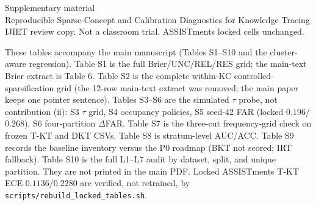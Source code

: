 \documentclass[11pt,a4paper]{article}
\begin{document}
\begin{center}
{\large Supplementary material}\\[4pt]
{\normalsize Reproducible Sparse-Concept and Calibration Diagnostics for Knowledge Tracing}\\[2pt]
{\small IJIET review copy. Not a classroom trial. ASSISTments locked cells unchanged.}
\end{center}
\vspace{0.8em}
\noindent These tables accompany the main manuscript (Tables S1--S10 and the cluster-aware regression). Table S1 is the full Brier/UNC/REL/RES grid; the main-text Brier extract is Table 6. Table S2 is the complete within-KC controlled-sparsification grid (the 12-row main-text extract was removed; the main paper keeps one pointer sentence). Tables S3--S6 are the simulated $\tau$ probe, not contribution (ii): S3 $\tau$ grid, S4 occupancy policies, S5 seed-42 FAR (locked $0.196$/$0.268$), S6 four-partition $\Delta$FAR. Table S7 is the three-cut frequency-grid check on frozen T-KT and DKT CSVs. Table S8 is stratum-level AUC/ACC. Table S9 records the baseline inventory versus the P0 roadmap (BKT not scored; IRT fallback). Table S10 is the full L1--L7 audit by dataset, split, and unique partition. They are not printed in the main PDF. Locked ASSISTments T-KT ECE $0.1136$/$0.2280$ are verified, not retrained, by \texttt{scripts/rebuild\_locked\_tables.sh}.












\end{document}
